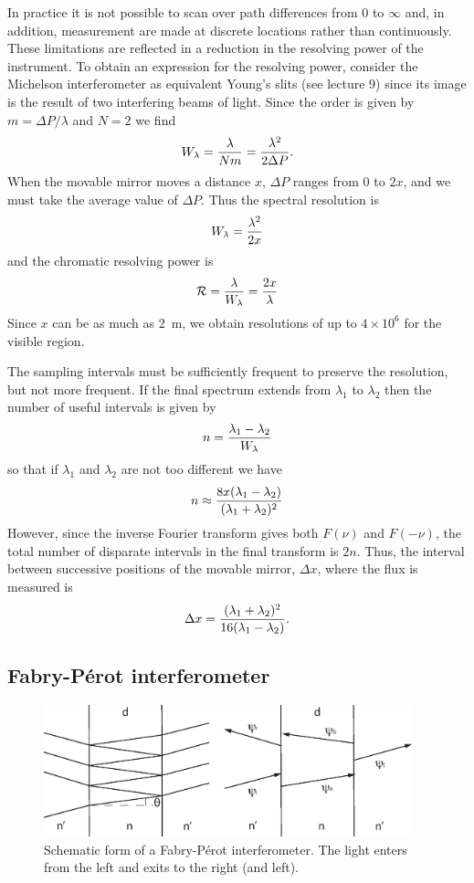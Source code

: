 In practice it is not possible to scan over path differences from 0 to $\infty$ and, in 
addition, measurement are made at discrete locations rather than continuously. These
limitations are reflected in a reduction in the resolving power of the instrument. To obtain an expression for the resolving power, consider the Michelson interferometer as equivalent Young's slits (see lecture 9) since its image is the result of two interfering
beams of light. Since the order is given by $m=\Delta P/\lambda$ and $N=2$ we find
\[
W_\lambda={\lambda\over Nm}={\lambda^2\over 2\Delta P}.
\]
When the movable mirror moves a distance $x$, $\Delta P$ ranges from $0$ to $2x$, and we must take the average value of $\Delta P$. Thus the spectral resolution is
\[
W_\lambda={\lambda^2\over 2x}
\]
and the chromatic resolving power is 
\[
{\cal R}={\lambda\over W_\lambda}={2x\over\lambda}
\]
Since $x$ can be as much as 2~m, we obtain resolutions of up to $4\times 10^6$ for the
visible region. 

The sampling intervals must be sufficiently frequent to preserve the resolution, but not more frequent. If the final spectrum extends from $\lambda_1$ to $\lambda_2$ then the
number of useful intervals is given by 
\[
n={\lambda_1-\lambda_2\over W_\lambda}
\]
so that if $\lambda_1$ and $\lambda_2$ are not too different we have
\[
n\approx{8x(\lambda_1-\lambda_2)\over(\lambda_1+\lambda_2)^2}
\]
However, since the inverse Fourier transform gives both $F(\nu)$ and $F(-\nu)$, the total
number of disparate intervals in the final transform is $2n$. Thus, the interval between successive positions of the movable mirror, $\Delta x$, where the flux is measured is
\[
\Delta x={(\lambda_1+\lambda_2)^2\over 16(\lambda_1-\lambda_2)}.
\]

\subsection{Fabry-P\'erot interferometer}

\begin{figure}[h]
  \centering
	\includegraphics[width=0.95\textwidth]{fabry-perot-schematic.eps}
  \caption{Schematic form of a Fabry-P\'erot interferometer. The light enters from the 
left and exits to the right (and left).}
  \label{fig:fabry-perot-schematic}
\end{figure}

